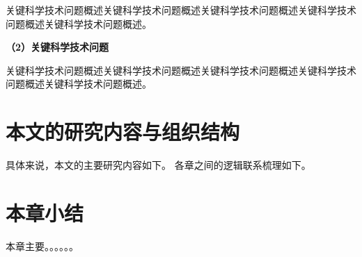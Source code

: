 关键科学技术问题概述关键科学技术问题概述关键科学技术问题概述关键科学技术问题概述关键科学技术问题概述。

\textbf{（2）关键科学技术问题}

关键科学技术问题概述关键科学技术问题概述关键科学技术问题概述关键科学技术问题概述关键科学技术问题概述。



\section{本文的研究内容与组织结构}
\label{sec:1_ResearchContents&Organization}

具体来说，本文的主要研究内容如下。
各章之间的逻辑联系梳理如下。



\section{本章小结}
\label{sec:1_Conclusion}

本章主要。。。。。。


